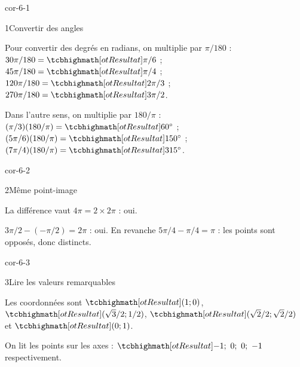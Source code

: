 \corrigesSouples


\begin{blocLivre}{cor-6-1}
\begin{corrige}{1}{Convertir des angles}
\begin{questions}
\item Pour convertir des degrés en radians, on multiplie par $\pi/180$ :
$30\pi/180=\res{\pi/6}$ ; $45\pi/180=\res{\pi/4}$ ;
$120\pi/180=\res{2\pi/3}$ ; $270\pi/180=\res{3\pi/2}$.
\item Dans l’autre sens, on multiplie par $180/\pi$ :
$(\pi/3)(180/\pi)=\res{60^\circ}$ ;
$(5\pi/6)(180/\pi)=\res{150^\circ}$ ;
$(7\pi/4)(180/\pi)=\res{315^\circ}$.
\end{questions}

\end{corrige}
\end{blocLivre}
\begin{blocLivre}{cor-6-2}
\begin{corrige}{2}{Même point-image}
\begin{questions}
\item La différence vaut $4\pi=2\times2\pi$ : oui.
\item $3\pi/2-(-\pi/2)=2\pi$ : oui. En revanche $5\pi/4-\pi/4=\pi$ : les points sont opposés, donc distincts.
\end{questions}
\label{figlivre-r06-02-images-cor}

\end{corrige}
\end{blocLivre}
\begin{blocLivre}{cor-6-3}
\begin{corrige}{3}{Lire les valeurs remarquables}
\begin{questions}
\item Les coordonnées sont $\res{(1;0)}$, $\res{(\sqrt3/2;1/2)}$, $\res{(\sqrt2/2;\sqrt2/2)}$ et $\res{(0;1)}$.
\item On lit les points sur les axes : $\res{-1;\ 0;\ 0;\ -1}$ respectivement.
\end{questions}
\label{figlivre-r06-03-valeurs-cor}

\end{corrige}
\end{blocLivre}
